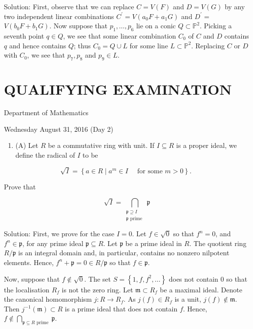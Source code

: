 \documentclass[10pt]{article}
\begin{document}
Solution: First, observe that we can replace $C=V(F)$ and $D=V(G)$ by any two independent linear combinations $C^{\prime}=V\left(a_{0} F+a_{1} G\right)$ and $D^{\prime}=$ $V\left(b_{0} F+b_{1} G\right)$. Now suppose that $p_{1}, \ldots, p_{6}$ lie on a conic $Q \subset \mathbb{P}^{2}$. Picking a seventh point $q \in Q$, we see that some linear combination $C_{0}$ of $C$ and $D$ contains $q$ and hence contains $Q$; thus $C_{0}=Q \cup L$ for some line $L \subset \mathbb{P}^{2}$. Replacing $C$ or $D$ with $C_{0}$, we see that $p_{7}, p_{8}$ and $p_{9} \in L$.

\section*{QUALIFYING EXAMINATION }
Department of Mathematics

Wednesday August 31, 2016 (Day 2)

\begin{enumerate}
  \item (A) Let $R$ be a commutative ring with unit. If $I \subseteq R$ is a proper ideal, we define the radical of $I$ to be
\end{enumerate}

$$
\sqrt{I}=\left\{a \in R \mid a^{m} \in I \quad \text { for some } m>0\right\} \text {. }
$$

Prove that

$$
\sqrt{I}=\bigcap_{\substack{\mathfrak{p} \supseteq I \\ \mathfrak{p} \text { prime }}} \mathfrak{p}
$$

Solution: First, we prove for the case $I=0$. Let $f \in \sqrt{0}$ so that $f^{n}=0$, and $f^{n} \in \mathfrak{p}$, for any prime ideal $\mathfrak{p} \subseteq R$. Let $\mathfrak{p}$ be a prime ideal in $R$. The quotient ring $R / \mathfrak{p}$ is an integral domain and, in particular, contains no nonzero nilpotent elements. Hence, $f^{n}+\mathfrak{p}=0 \in R / \mathfrak{p}$ so that $f \in \mathfrak{p}$.

Now, suppose that $f \notin \sqrt{0}$. The set $S=\left\{1, f, f^{2}, \ldots\right\}$ does not contain 0 so that the localisation $R_{f}$ is not the zero ring. Let $\mathfrak{m} \subset R_{f}$ be a maximal ideal. Denote the canonical homomorphism $j: R \rightarrow R_{f}$. As $j(f) \in R_{f}$ is a unit, $j(f) \notin \mathfrak{m}$. Then $j^{-1}(\mathfrak{m}) \subset R$ is a prime ideal that does not contain $f$. Hence, $f \notin \bigcap_{\mathfrak{p} \subseteq R \text { prime }} \mathfrak{p}$.
\end{document}
